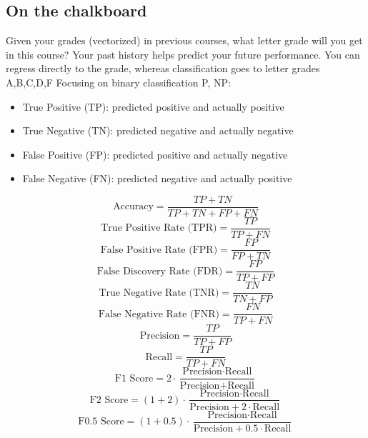 \documentclass[11pt]{article}
\theoremstyle{definition}
\begin{document}
\subsection{On the chalkboard}
Given your grades (vectorized) in previous courses, what letter grade will you get in this course?
Your past history helps predict your future performance.
You can regress directly to the grade, whereas classification goes to letter grades {A,B,C,D,F}
Focusing on binary classification {P, NP}:
\begin{itemize}
    \item True Positive (TP): predicted positive and actually positive
    \item True Negative (TN): predicted negative and actually negative
    \item False Positive (FP): predicted positive and actually negative
    \item False Negative (FN): predicted negative and actually positive
\end{itemize}
\begin{equation}
    \text{Accuracy} = \frac{TP + TN}{TP + TN + FP + FN}
\end{equation}
\begin{equation}
    \text{True Positive Rate (TPR)} = \frac{TP}{TP + FN}
\end{equation}
\begin{equation}
    \text{False Positive Rate (FPR)} = \frac{FP}{FP + TN}
\end{equation}
\begin{equation}
    \text{False Discovery Rate (FDR)} = \frac{FP}{TP + FP}
\end{equation}
\begin{equation}
    \text{True Negative Rate (TNR)} = \frac{TN}{TN + FP}
\end{equation}
\begin{equation}
    \text{False Negative Rate (FNR)} = \frac{FN}{TP + FN}
\end{equation}
\begin{equation}
    \text{Precision} = \frac{TP}{TP + FP}
\end{equation}
\begin{equation}
    \text{Recall} = \frac{TP}{TP + FN}
\end{equation}
\begin{equation}
    \text{F1 Score} = 2 \cdot \frac{\text{Precision} \cdot \text{Recall}}{\text{Precision} + \text{Recall}}
\end{equation}
\begin{equation}
    \text{F2 Score} = (1 + 2) \cdot \frac{\text{Precision} \cdot \text{Recall}}{\text{Precision} + 2 \cdot \text{Recall}}
\end{equation}
\begin{equation}
    \text{F0.5 Score} = (1 + 0.5) \cdot \frac{\text{Precision} \cdot \text{Recall}}{\text{Precision} + 0.5 \cdot \text{Recall}}
\end{equation}
\end{document}
